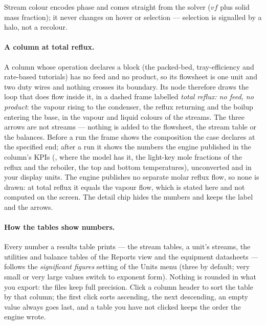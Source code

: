 \documentclass[11pt,a4paper]{article}
\begin{document}
Stream colour encodes phase and comes straight from the solver ($vf$
plus solid mass fraction); it never changes on hover or selection ---
selection is signalled by a halo, not a recolour.

\paragraph{A column at total reflux.}\label{sec:gui-total-reflux}  A column
whose operation declares a  block (the packed-bed,
tray-efficiency and rate-based tutorials) has no feed and no product, so its
flowsheet is one unit and two duty wires and nothing crosses its boundary.
Its node therefore draws the loop that does flow inside it, in a dashed
frame labelled \emph{total reflux: no feed, no product}: the vapour rising to
the condenser, the reflux returning and the boilup entering the base, in the
vapour and liquid colours of the streams.  The three arrows are not
streams --- nothing is added to the flowsheet, the stream table or the
balances.  Before a run the frame shows the composition the case declares at
the specified end; after a run it shows the numbers the engine published in
the column's KPIs (,  where the model has it,
the light-key mole fractions of the reflux and the reboiler, the top and
bottom temperatures), unconverted and in your display units.  The engine
publishes no separate molar reflux flow, so none is drawn: at total reflux it
equals the vapour flow, which is stated here and not computed on the screen.
The detail chip hides the numbers and keeps the label and the arrows.

\paragraph{How the tables show numbers.}  Every number a results table
prints --- the stream tables, a unit's streams, the utilities and balance
tables of the Reports view and the equipment datasheets --- follows the
\emph{significant figures} setting of the Units menu (three by default;
very small or very large values switch to exponent form).  Nothing is rounded
in what you export: the files keep full precision.  Click a column header to
sort the table by that column; the first click sorts ascending, the next
descending, an empty value always goes last, and a table you have not
clicked keeps the order the engine wrote.
\end{document}
